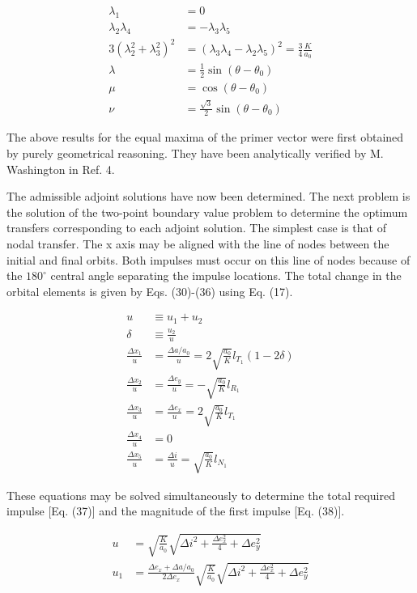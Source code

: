\documentclass[12pt]{article}
\begin{document}
\begin{align}
\lambda_1 &= 0 \tag{24} \\
\lambda_2 \lambda_4 &= -\lambda_3 \lambda_5 \tag{25} \\
3(\lambda_2^2 + \lambda_3^2)^2 &= (\lambda_3 \lambda_4 - \lambda_2 \lambda_5)^2 = \frac{3}{4} \frac{K}{a_0} \tag{26} \\
\lambda &= \frac{1}{2} \sin (\theta - \theta_0) \tag{27} \\
\mu &= \cos (\theta - \theta_0) \tag{28} \\
\nu &= \frac{\sqrt{3}}{2} \sin (\theta - \theta_0) \tag{29}
\end{align}

The above results for the equal maxima of the primer vector were first obtained by purely geometrical reasoning. They have been analytically verified by M. Washington in Ref. 4.

The admissible adjoint solutions have now been determined. The next problem is the solution of the two-point boundary value problem to determine the optimum transfers corresponding to each adjoint solution. The simplest case is that of nodal transfer. The x axis may be aligned with the line of nodes between the initial and final orbits. Both impulses must occur on this line of nodes because of the $180^\circ$ central angle separating the impulse locations. The total change in the orbital elements is given by Eqs. (30)-(36) using Eq. (17).

\begin{align}
u &\equiv u_1 + u_2 \tag{30} \\
\delta &\equiv \frac{u_2}{u} \tag{31} \\
\frac{\Delta x_1}{u} &= \frac{\Delta a / a_0}{u} = 2 \sqrt{\frac{a_0}{K}} l_{T_1}(1 - 2\delta) \tag{32} \\
\frac{\Delta x_2}{u} &= \frac{\Delta e_y}{u} = -\sqrt{\frac{a_0}{K}} l_{R_1} \tag{33} \\
\frac{\Delta x_3}{u} &= \frac{\Delta e_x}{u} = 2 \sqrt{\frac{a_0}{K}} l_{T_1} \tag{34} \\
\frac{\Delta x_4}{u} &= 0 \tag{35} \\
\frac{\Delta x_5}{u} &= \frac{\Delta i}{u} = \sqrt{\frac{a_0}{K}} l_{N_1} \tag{36}
\end{align}

These equations may be solved simultaneously to determine the total required impulse [Eq. (37)] and the magnitude of the first impulse [Eq. (38)].

\begin{align}
u &= \sqrt{\frac{K}{a_0}} \sqrt{\Delta i^2 + \frac{\Delta e_x^2}{4} + \Delta e_y^2} \tag{37} \\
u_1 &= \frac{\Delta e_x + \Delta a / a_0}{2 \Delta e_x} \sqrt{\frac{K}{a_0}} \sqrt{\Delta i^2 + \frac{\Delta e_x^2}{4} + \Delta e_y^2} \tag{38}
\end{align}
\end{document}
